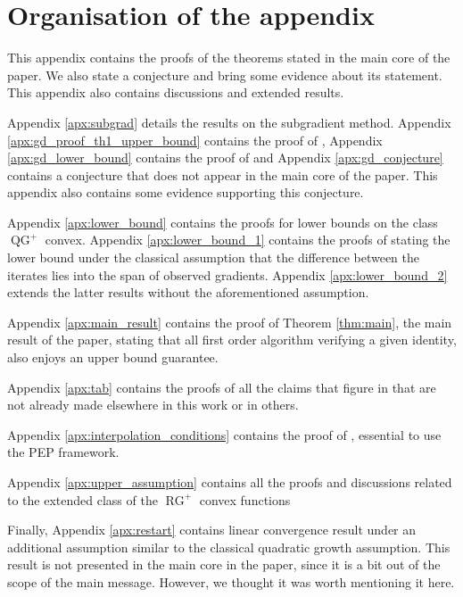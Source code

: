 \documentclass{article}
\def\QG{\operatorname{QG}}
\def\RG{\operatorname{RG}}
\begin{document}


\clearpage
\appendix

    \section*{Organisation of the appendix}
    
        This appendix contains the proofs of the theorems stated in the main core of the paper. We also state a conjecture and bring some evidence about its statement. This appendix also contains discussions and extended results.
        
        Appendix \ref{apx:subgrad} details the results on the subgradient method. Appendix \ref{apx:gd_proof_th1_upper_bound} contains the proof of , Appendix \ref{apx:gd_lower_bound} contains the proof of  and Appendix \ref{apx:gd_conjecture} contains a conjecture that does not appear in the main core of the paper. This appendix also contains some evidence supporting this conjecture.
        
        Appendix \ref{apx:lower_bound} contains the proofs for lower bounds on the class $\QG^+$ convex.
        Appendix \ref{apx:lower_bound_1} contains the proofs of  stating the lower bound under the classical assumption that the difference between the iterates lies into the span of observed gradients.
        Appendix \ref{apx:lower_bound_2} extends the latter results without the aforementioned assumption.
        
        Appendix \ref{apx:main_result} contains the proof of Theorem \ref{thm:main}, the main result of the paper, stating that all first order algorithm verifying a given identity, also enjoys an upper bound guarantee.
        
        Appendix \ref{apx:tab} contains the proofs of all the claims that figure in  that are not already made elsewhere in this work or in others.
        
        Appendix \ref{apx:interpolation_conditions} contains the proof of , essential to use the PEP framework.
        
        Appendix \ref{apx:upper_assumption} contains all the proofs and discussions related to the extended class of the $\RG^+$ convex functions
        
        Finally, Appendix \ref{apx:restart} contains linear convergence result under an additional assumption similar to the classical quadratic growth assumption. This result is not presented in the main core in the paper, since it is a bit out of the scope of the main message. However, we thought it was worth mentioning it here.
    
    \hypersetup{linkcolor = black}
    \setlength\cftparskip{2pt}
    \setlength\cftbeforesecskip{2pt}
    \setlength\cftaftertoctitleskip{3pt}
    \setcounter{tocdepth}{1}
    \tableofcontents
    \hypersetup{linkcolor=blue}
    
    
\end{document}
